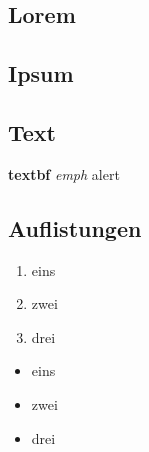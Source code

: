 \subsection{Lorem}
\begin{frame}{\subsecname}
  \blindtext
\end{frame}

\subsection{Ipsum}
\begin{frame}{\subsecname}
  \blinditemize
\end{frame}

\subsection{Text}
\begin{frame}{\subsecname}
  \textbf{textbf}
  \emph{emph}
  \newline
  \alert{alert}
  \newline
  \color{dhbw-red}{red}
  \color{dhbw-green}{green}
  \color{dhbw-blue}{blue}
\end{frame}

\subsection{Auflistungen}
\begin{frame}{\subsecname}

  \begin{minipage}[t]{0.5\textwidth}
    \par\medskip
    \begin{enumerate}
      \item eins
      \item zwei
      \item drei
    \end{enumerate}
  \end{minipage}%
  \begin{minipage}[t]{0.5\textwidth}
    \par\medskip
    \begin{itemize}
      \item eins
      \item zwei
      \item drei
    \end{itemize}
  \end{minipage}

\end{frame}

